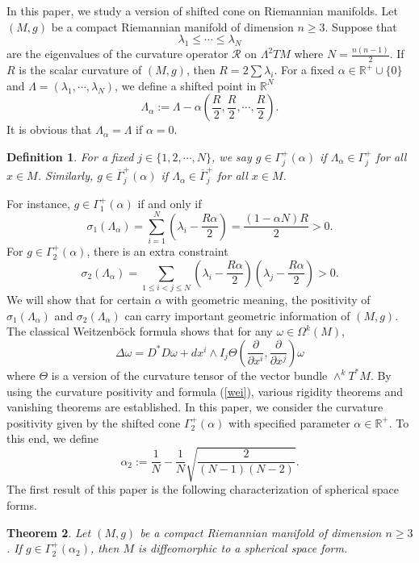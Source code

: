 \documentclass[12pt]{amsart}
\theoremstyle{plain}
\newtheorem{thm}{Theorem}[section]
\newtheorem{defn}[thm]{Definition}
\theoremstyle{definition}
\newcommand{\btheorem}{\begin{thm}}
\newcommand{\etheorem}{\end{thm}}
\newcommand{\bdefinition}{\begin{defn}}
\newcommand{\edefinition}{\end{defn}}
\newcommand{\p}{\partial}
\renewcommand{\bar}{\overline}
\newcommand{\beq}{\begin{equation}}
\newcommand{\eeq}{\end{equation}}
\newcommand{\Om}{\Omega}
\renewcommand{\>}{\rightarrow}
\newcommand{\R}{{\mathbb R}}
\numberwithin{equation}{section} %
\begin{document}
	In this paper, we study a version of shifted cone on Riemannian manifolds. Let $(M,g)$ be a compact Riemannian manifold of dimension $n\geq 3$. Suppose that $$\lambda_1\leq \cdots \leq \lambda_N$$ are the eigenvalues of the curvature operator $\mathscr R$ on $\Lambda^2TM$ where $N=\frac{n(n-1)}{2}$. If $R$ is the scalar curvature of $(M,g)$, then  $R=2\sum\lambda_i$. For a fixed $\alpha\in \R^+\cup \{0\}$ and $\Lambda=(\lambda_1,\cdots, \lambda_N)$, we define
	 a shifted point in $\R^N$
	\beq \Lambda_{\alpha}:=\Lambda-\alpha \left(\frac{R}{2}, \frac{R}{2},\cdots, \frac{R}{2}\right). \eeq 
	It is obvious that $\Lambda_\alpha=\Lambda$ if $\alpha=0$.
	
	\bdefinition For a  fixed $j\in\{1,2,\cdots,N\}$, we say $g\in\Gamma_j^+(\alpha)$ if $\Lambda_{\alpha}\in \Gamma_j^+$ for all $x\in M$. Similarly,  $g\in\bar \Gamma_j^+(\alpha)$  if $\Lambda_{\alpha}\in \bar \Gamma_j^+$ for all $x\in M$. 
	 \edefinition 	

\noindent	For instance, $g\in\Gamma_1^+(\alpha)$ if and only if \beq \sigma_1\left(\Lambda_\alpha\right)=\sum_{i=1}^N  \left(\lambda_i-\frac{R\alpha}{2}\right)=\frac{(1-\alpha N)R}{2}>0.\eeq 
For  $g\in\Gamma_2^+(\alpha)$,  there is an extra constraint
\beq \sigma_2\left(\Lambda_\alpha\right)=\sum_{1\leq i<j\leq N}  \left(\lambda_i-\frac{R\alpha}{2}\right) \left(\lambda_j-\frac{R\alpha}{2}\right)>0.\eeq 
We will show that for certain  $\alpha$ with geometric meaning,  the positivity of  $\sigma_1\left(\Lambda_\alpha\right)$ and $ \sigma_2\left(\Lambda_\alpha\right)$ can carry important geometric information of $(M,g)$.\\



The classical Weitzenb\"ock formula shows that 	
for any $\omega\in \Om^k(M)$,
\beq  \Delta \omega=D^*D\omega+ dx^i\wedge I_j \Theta \left(\frac{\p}{\p x^i}, \frac{\p}{\p x^j}\right)\omega \label{wei}\eeq
where $\Theta$ is a version of the curvature tensor of the vector bundle  $\wedge^k T^*M$. By using the curvature positivity and formula (\ref{wei}), various rigidity theorems and vanishing theorems are established.  In this paper, we consider the curvature positivity given by the shifted cone $\Gamma_2^+(\alpha)$ with specified parameter $\alpha \in \R^+$. To this end,  we define 
	\beq \alpha_2:=\frac{1}{N}-\frac{1}{N}\sqrt{\frac{2}{(N-1)(N-2)}}. \label{alpha2}\eeq 
The first result of this paper is the following characterization of spherical  space forms.
\btheorem\label{maintheorem1} Let $(M,g)$ be a compact Riemannian manifold of dimension $n\geq 3$. If $g\in {\Gamma}_2^+(\alpha_2)$, then  $M$ is diffeomorphic to a spherical space form.
\etheorem
\end{document}
